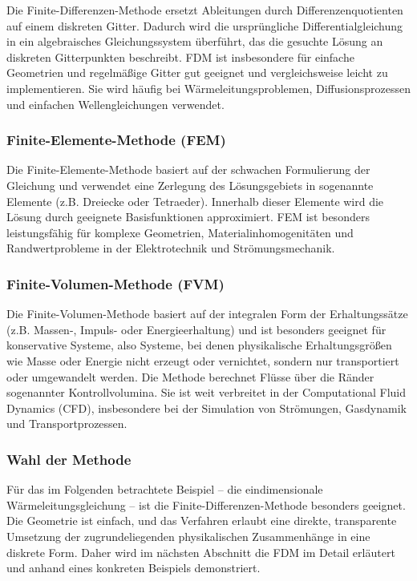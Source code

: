 Die Finite-Differenzen-Methode ersetzt Ableitungen durch Differenzenquotienten auf einem diskreten Gitter.
Dadurch wird die ursprüngliche Differentialgleichung in ein algebraisches Gleichungssystem überführt, das die gesuchte Lösung an diskreten Gitterpunkten beschreibt.
FDM ist insbesondere für einfache Geometrien und regelmäßige Gitter gut geeignet und vergleichsweise leicht zu implementieren.
Sie wird häufig bei Wärmeleitungsproblemen, Diffusionsprozessen und einfachen Wellengleichungen verwendet.

\subsubsection{Finite-Elemente-Methode (FEM)}

Die Finite-Elemente-Methode basiert auf der schwachen Formulierung der Gleichung und verwendet eine Zerlegung des Lösungsgebiets in sogenannte Elemente (z.B. Dreiecke oder Tetraeder).
Innerhalb dieser Elemente wird die Lösung durch geeignete Basisfunktionen approximiert.
FEM ist besonders leistungsfähig für komplexe Geometrien, Materialinhomogenitäten und Randwertprobleme in der Elektrotechnik und Strömungsmechanik.

\subsubsection{Finite-Volumen-Methode (FVM)}

Die Finite-Volumen-Methode basiert auf der integralen Form der Erhaltungssätze (z.B. Massen-, Impuls- oder Energieerhaltung) und ist besonders geeignet für konservative Systeme, also Systeme, bei denen physikalische Erhaltungsgrößen wie Masse oder Energie nicht erzeugt oder vernichtet, sondern nur transportiert oder umgewandelt werden.
Die Methode berechnet Flüsse über die Ränder sogenannter Kontrollvolumina.
Sie ist weit verbreitet in der Computational Fluid Dynamics (CFD), insbesondere bei der Simulation von Strömungen, Gasdynamik und Transportprozessen.

\subsubsection{Wahl der Methode}

Für das im Folgenden betrachtete Beispiel – die eindimensionale Wärmeleitungsgleichung – ist die Finite-Differenzen-Methode besonders geeignet.
Die Geometrie ist einfach, und das Verfahren erlaubt eine direkte, transparente Umsetzung der zugrundeliegenden physikalischen Zusammenhänge in eine diskrete Form.
Daher wird im nächsten Abschnitt die FDM im Detail erläutert und anhand eines konkreten Beispiels demonstriert.

